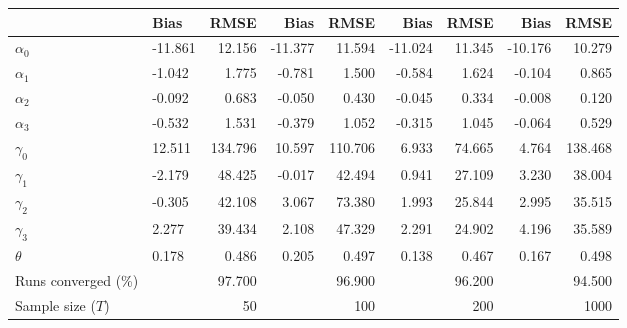 
\begin{tabular}[t]{llrrrrrrr}
\toprule
  & Bias & RMSE & Bias & RMSE & Bias & RMSE & Bias & RMSE\\
\midrule
$\alpha_{0}$ & -11.861 & 12.156 & -11.377 & 11.594 & -11.024 & 11.345 & -10.176 & 10.279\\
$\alpha_{1}$ & -1.042 & 1.775 & -0.781 & 1.500 & -0.584 & 1.624 & -0.104 & 0.865\\
$\alpha_{2}$ & -0.092 & 0.683 & -0.050 & 0.430 & -0.045 & 0.334 & -0.008 & 0.120\\
$\alpha_{3}$ & -0.532 & 1.531 & -0.379 & 1.052 & -0.315 & 1.045 & -0.064 & 0.529\\
$\gamma_{0}$ & 12.511 & 134.796 & 10.597 & 110.706 & 6.933 & 74.665 & 4.764 & 138.468\\
$\gamma_{1}$ & -2.179 & 48.425 & -0.017 & 42.494 & 0.941 & 27.109 & 3.230 & 38.004\\
$\gamma_{2}$ & -0.305 & 42.108 & 3.067 & 73.380 & 1.993 & 25.844 & 2.995 & 35.515\\
$\gamma_{3}$ & 2.277 & 39.434 & 2.108 & 47.329 & 2.291 & 24.902 & 4.196 & 35.589\\
$\theta$ & 0.178 & 0.486 & 0.205 & 0.497 & 0.138 & 0.467 & 0.167 & 0.498\\
Runs converged (\%) &  & 97.700 &  & 96.900 &  & 96.200 &  & 94.500\\
Sample size ($T$) &  & 50 &  & 100 &  & 200 &  & 1000\\
\bottomrule
\end{tabular}
